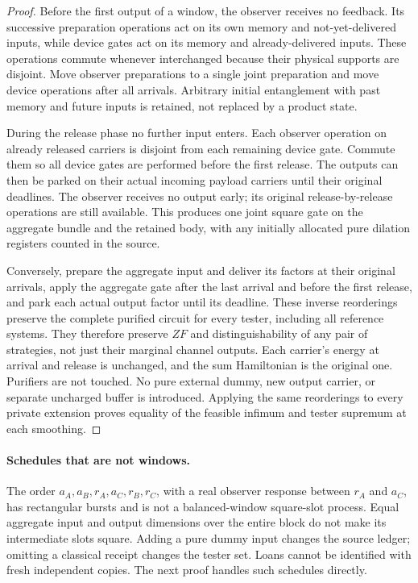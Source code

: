 \documentclass[11pt]{article}
\theoremstyle{definition}
\theoremstyle{remark}
\begin{document}
\begin{proof}
Before the first output of a window, the observer receives no feedback. Its successive preparation operations act on its own memory and not-yet-delivered inputs, while device gates act on its memory and already-delivered inputs. These operations commute whenever interchanged because their physical supports are disjoint. Move observer preparations to a single joint preparation and move device operations after all arrivals. Arbitrary initial entanglement with past memory and future inputs is retained, not replaced by a product state.

During the release phase no further input enters. Each observer operation on already released carriers is disjoint from each remaining device gate. Commute them so all device gates are performed before the first release. The outputs can then be parked on their actual incoming payload carriers until their original deadlines. The observer receives no output early; its original release-by-release operations are still available. This produces one joint square gate on the aggregate bundle and the retained body, with any initially allocated pure dilation registers counted in the source.

Conversely, prepare the aggregate input and deliver its factors at their original arrivals, apply the aggregate gate after the last arrival and before the first release, and park each actual output factor until its deadline. These inverse reorderings preserve the complete purified circuit for every tester, including all reference systems. They therefore preserve $ZF$ and distinguishability of any pair of strategies, not just their marginal channel outputs. Each carrier's energy at arrival and release is unchanged, and the sum Hamiltonian is the original one. Purifiers are not touched. No pure external dummy, new output carrier, or separate uncharged buffer is introduced. Applying the same reorderings to every private extension proves equality of the feasible infimum and tester supremum at each smoothing.
\end{proof}

\paragraph{Schedules that are not windows.}
The order $a_A,a_B,r_A,a_C,r_B,r_C$, with a real observer response between $r_A$ and $a_C$, has rectangular bursts and is not a balanced-window square-slot process. Equal aggregate input and output dimensions over the entire block do not make its intermediate slots square. Adding a pure dummy input changes the source ledger; omitting a classical receipt changes the tester set. Loans cannot be identified with fresh independent copies. The next proof handles such schedules directly.
\end{document}
